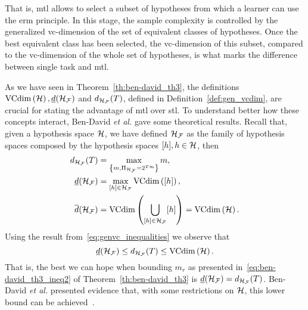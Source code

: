 That is, \acrshort{mtl} allows to select a subset of hypotheses from which a learner can use the \acrshort{erm} principle. In this stage, the sample complexity is controlled by the generalized \acrshort{vc}-dimension of the set of equivalent classes of hypotheses. Once the best equivalent class has been selected, 
the \acrshort{vc}-dimension of this subset, compared to the \acrshort{vc}-dimension of the whole set of hypotheses, is what marks the difference between single task and \acrshort{mtl}.

As we have seen in Theorem~\ref{th:ben-david_th3}, the definitions $\operatorname{VCdim}\left(\mathcal{H}\right), \underline{d}(\mathcal{H}_{\mathcal{F}})$ and $d_{\mathcal{H}_{\mathcal{F}}}(T)$, defined in Definition~\ref{def:gen_vcdim}, are crucial for stating the advantage of \acrshort{mtl} over \acrshort{stl}. 
To understand better how these concepts interact, Ben-David \emph{et al.} gave some theoretical results.
Recall that, given a hypothesis space $\mathcal{H}$, we have defined $\mathcal{H}_{\mathcal{F}}$ as the family of hypothesis spaces composed by the hypothesis spaces $\lbrack h\rbrack, h \in \mathcal{H}$, then
\begin{align*}
    \nonumber
    d_{\mathcal{H}_{\mathcal{F}}}(T) &= \max_{\left\{m ,\Pi_{\mathcal{H}_{\mathcal{F}}} = 2^{T m}\right\} } m, \\
    \underline{d}(\mathcal{H}_{\mathcal{F}}) &= \max_{\lbrack h\rbrack \in \mathcal{H}_{\mathcal{F}}} \operatorname{VCdim}\left(\lbrack h\rbrack\right), \\    
    \overline{d}(\mathcal{H}_{\mathcal{F}}) &= \operatorname{VCdim}\left(\bigcup_{\lbrack h\rbrack \in \mathcal{H}_{\mathcal{F}}} \lbrack h\rbrack\right)= \operatorname{VCdim}\left(\mathcal{H}\right).
\end{align*}
Using the result from~\eqref{eq:genvc_inequalities} we observe that
\begin{equation}
    \nonumber
    \underline{d}(\mathcal{H}_{\mathcal{F}}) \leq d_{\mathcal{H}_{\mathcal{F}}}(T) \leq \operatorname{VCdim}\left(\mathcal{H}\right) .
\end{equation}
That is, the best we can hope when bounding $m_r$ as presented in~\eqref{eq:ben-david_th3_ineq2} of Theorem~\ref{th:ben-david_th3} is $\underline{d}(\mathcal{H}_{\mathcal{F}}) = d_{\mathcal{H}_{\mathcal{F}}}(T)$. 
Ben-David \emph{et al.} presented evidence that, with some restrictions on $\mathcal{H}$, this lower bound can be achieved~\cite[Theorem~4]{Ben-DavidB08}.
